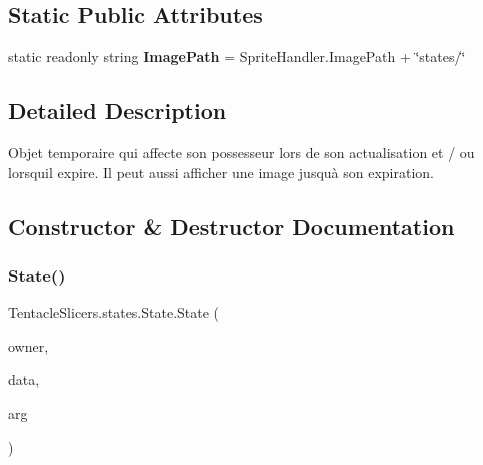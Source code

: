 \subsection*{Static Public Attributes}
\begin{DoxyCompactItemize}
\item 
\mbox{\label{class_tentacle_slicers_1_1states_1_1_state_a891bff3231c4fd22b6757e1630c0c9d6}} 
static readonly string {\bfseries Image\+Path} = Sprite\+Handler.\+Image\+Path + \char`\"{}states/\char`\"{}
\end{DoxyCompactItemize}


\subsection{Detailed Description}
Objet temporaire qui affecte son possesseur lors de son actualisation et / ou lorsqu\textquotesingle{}il expire. Il peut aussi afficher une image jusqu\textquotesingle{}à son expiration. 



\subsection{Constructor \& Destructor Documentation}
\mbox{\label{class_tentacle_slicers_1_1states_1_1_state_a405645215bbd1ac34d5b0a209366da29}} 
\subsubsection{\texorpdfstring{State()}{State()}}
{\footnotesize\ttfamily Tentacle\+Slicers.\+states.\+State.\+State (\begin{DoxyParamCaption}\item[{\hyperlink{class_tentacle_slicers_1_1actors_1_1_controlled_actor}{Controlled\+Actor}}]{owner,  }\item[{\hyperlink{class_tentacle_slicers_1_1states_1_1_state_data}{State\+Data}}]{data,  }\item[{object}]{arg }\end{DoxyParamCaption})}



